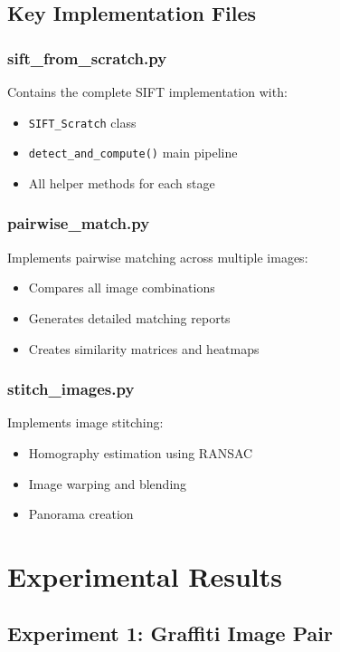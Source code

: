 \documentclass[12pt,a4paper]{article}
\begin{document}
\subsection{Key Implementation Files}

\subsubsection{sift\_from\_scratch.py}
Contains the complete SIFT implementation with:
\begin{itemize}
    \item \texttt{SIFT\_Scratch} class
    \item \texttt{detect\_and\_compute()} main pipeline
    \item All helper methods for each stage
\end{itemize}

\subsubsection{pairwise\_match.py}
Implements pairwise matching across multiple images:
\begin{itemize}
    \item Compares all image combinations
    \item Generates detailed matching reports
    \item Creates similarity matrices and heatmaps
\end{itemize}

\subsubsection{stitch\_images.py}
Implements image stitching:
\begin{itemize}
    \item Homography estimation using RANSAC
    \item Image warping and blending
    \item Panorama creation
\end{itemize}

\section{Experimental Results}

\subsection{Experiment 1: Graffiti Image Pair}
\end{document}
